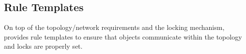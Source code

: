 \documentclass[sigplan,10pt,review,anonymous,screen]{acmart}\settopmatter{printfolios=true,printccs=false,printacmref=false}
\begin{document}
\subsection{Rule Templates}
\label{sec-rule-templates}

\newcommand{\rtname}[1]{{\small\sf\bf #1}}

\newcommand{\uled}{\ensuremath{\textsf{UL}}}
\newcommand{\dled}{\ensuremath{\textsf{DL}}}
\newcommand{\ulfree}{\ensuremath{\textsf{UL}_{\times}}}
\newcommand{\dlfree}{\ensuremath{\textsf{DL}_{\times}}}

\newcommand{\setul}{\ensuremath{\textsf{UL}\Uparrow}}
\newcommand{\setdl}{\ensuremath{\textsf{DL}\Uparrow}}
\newcommand{\relul}{\ensuremath{\textsf{UL}\Downarrow}}
\newcommand{\reldl}{\ensuremath{\textsf{DL}\Downarrow}}
\newcommand{\stsilent}{\ensuremath{\textsf{SLT}}}

\newcommand{\ppo}[3]{\ensuremath{\{#1\}#2\lbrack#3\rbrack}}
\newcommand*{\bfrac}[2]{\genfrac{}{}{0pt}{}{#1}{#2}}

On top of the topology/network requirements and the locking mechanism, \hemiola{} provides rule templates to ensure that objects communicate within the topology and locks are properly set.
\end{document}
